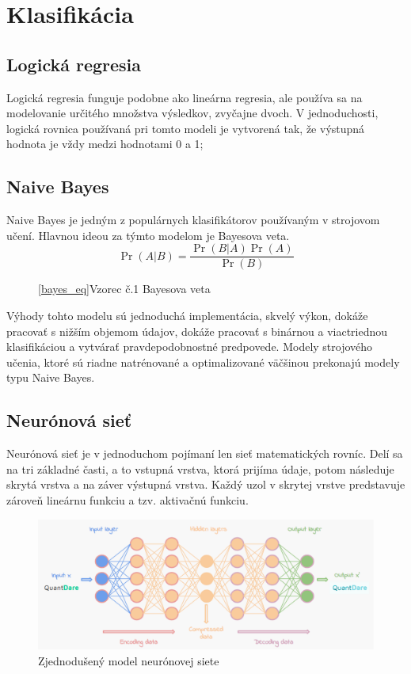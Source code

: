 \documentclass[8pt,oneside,slovak,a4paper]{article}
\begin{document}
\section{Klasifikácia}
\subsection{Logická regresia}
Logická regresia funguje podobne ako lineárna regresia, ale používa sa na modelovanie určitého množstva výsledkov, zvyčajne dvoch. V jednoduchosti, logická rovnica používaná pri tomto modeli je vytvorená tak, že výstupná hodnota je vždy medzi hodnotami 0 a 1;
\subsection{Naive Bayes}
Naive Bayes je jedným z populárnych klasifikátorov používaným v strojovom učení. Hlavnou ideou za týmto modelom je Bayesova veta.
\begin{equation} \label{bayes_eq}
 \Pr(A|B)=\frac{\Pr(B|A)\Pr(A)}{\Pr(B)}
\end{equation}
\begin{figure}[h]
\centering
\ref{bayes_eq}Vzorec č.1  Bayesova veta \cite{bayes_equation}
\end{figure}
\newline Výhody tohto modelu sú jednoduchá implementácia, skvelý výkon, dokáže pracovať s nižším objemom údajov, dokáže pracovať s binárnou a viactriednou klasifikáciou a vytvárať pravdepodobnostné predpovede. \newline \hspace*{0.4cm} Modely strojového učenia, ktoré sú riadne natrénované a optimalizované väčšinou prekonajú modely typu Naive Bayes. \cite{quick_review}
\subsection{Neurónová sieť} 
Neurónová sieť je v jednoduchom pojímaní len sieť matematických rovníc. Delí sa na tri základné časti, a to vstupná vrstva, ktorá prijíma údaje, potom následuje skrytá vrstva a na záver výstupná vrstva. Každý uzol v skrytej vrstve predstavuje zároveň lineárnu funkciu a tzv. aktivačnú funkciu.
\begin{figure}[h] 
\centering
\includegraphics[scale=0.4]{neural_network_img}
\caption{Zjednodušený model neurónovej siete \cite{neural_network_image}}
\end{figure}
\newpage
\end{document}
